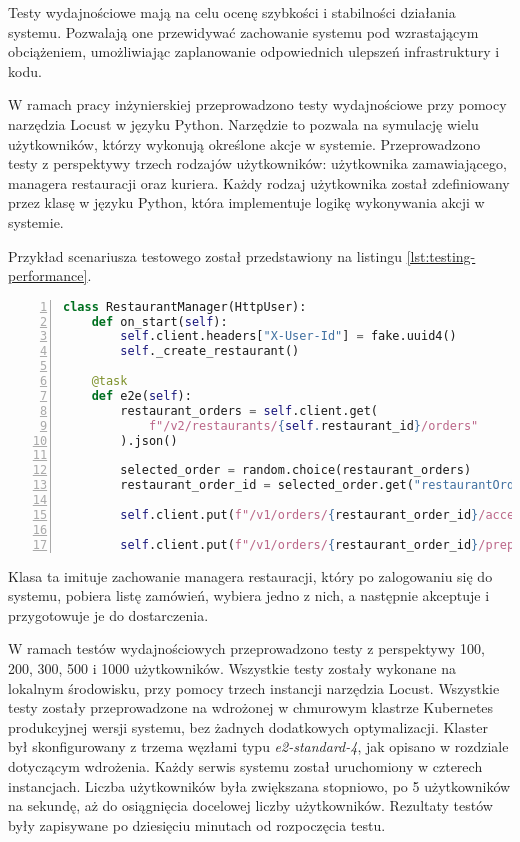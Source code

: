 Testy wydajnościowe mają na celu ocenę szybkości i stabilności działania systemu. Pozwalają one przewidywać zachowanie systemu pod wzrastającym obciążeniem, umożliwiając zaplanowanie odpowiednich ulepszeń infrastruktury i kodu.

W ramach pracy inżynierskiej przeprowadzono testy wydajnościowe przy pomocy narzędzia Locust \cite{locust} w języku Python. Narzędzie to pozwala na symulację wielu użytkowników, którzy wykonują określone akcje w systemie. Przeprowadzono testy z perspektywy trzech rodzajów użytkowników: użytkownika zamawiającego, managera restauracji oraz kuriera. Każdy rodzaj użytkownika został zdefiniowany przez klasę w języku Python, która implementuje logikę wykonywania akcji w systemie. 

Przykład scenariusza testowego został przedstawiony na listingu \ref{lst:testing-performance}.

\begin{lstlisting}[caption={Scenariusz testowy w ramach testów wydajnościowych obsługujących managera restauracji},label={lst:testing-performance},captionpos=b,language=Python,numbers=left]
class RestaurantManager(HttpUser):
    def on_start(self):
        self.client.headers["X-User-Id"] = fake.uuid4()
        self._create_restaurant()

    @task
    def e2e(self):
        restaurant_orders = self.client.get(
            f"/v2/restaurants/{self.restaurant_id}/orders"
        ).json()

        selected_order = random.choice(restaurant_orders)
        restaurant_order_id = selected_order.get("restaurantOrderId")

        self.client.put(f"/v1/orders/{restaurant_order_id}/accept")

        self.client.put(f"/v1/orders/{restaurant_order_id}/prepare" )
\end{lstlisting}

Klasa ta imituje zachowanie managera restauracji, który po zalogowaniu się do systemu, pobiera listę zamówień, wybiera jedno z nich, a następnie akceptuje i przygotowuje je do dostarczenia.

W ramach testów wydajnościowych przeprowadzono testy z perspektywy 100, 200, 300, 500 i 1000 użytkowników. Wszystkie testy zostały wykonane na lokalnym środowisku, przy pomocy trzech instancji narzędzia Locust. Wszystkie testy zostały przeprowadzone na wdrożonej w chmurowym klastrze Kubernetes produkcyjnej wersji systemu, bez żadnych dodatkowych optymalizacji. Klaster był skonfigurowany z trzema węzłami typu \textit{e2-standard-4}, jak opisano w rozdziale dotyczącym wdrożenia. Każdy serwis systemu został uruchomiony w czterech instancjach. Liczba użytkowników była zwiększana stopniowo, po 5 użytkowników na sekundę, aż do osiągnięcia docelowej liczby użytkowników. Rezultaty testów były zapisywane po dziesięciu minutach od rozpoczęcia testu. 

